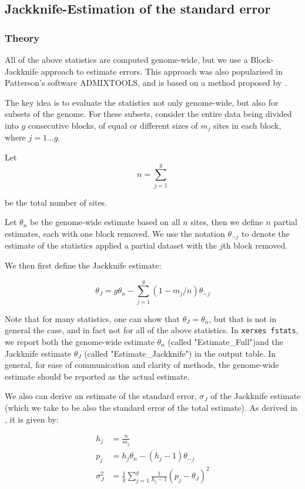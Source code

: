 \documentclass{article}
\begin{document}
\subsection{Jackknife-Estimation of the standard error}

\subsubsection{Theory}
All of the above statistics are computed genome-wide, but we use a Block-Jackknife approach to estimate errors. This approach was also popularised in Patterson's software ADMIXTOOLS, and is based on a method proposed by \cite{Busing1999-ev}.

The key idea is to evaluate the statistics not only genome-wide, but also for subsets of the genome. For these subsets, consider the entire data being divided into $g$ consecutive blocks, of equal or different sizes of $m_j$ sites in each block, where $j=1\ldots g$.

Let 
$$n = \sum_{j=1}^g$$

be the total number of sites.

Let $\theta_n$ be the genome-wide estimate based on all $n$ sites, then we define $n$ partial estimates, each with one block removed. We use the notation $\theta_{-j}$ to denote the estimate of the statistics applied a partial dataset with the $j$th block removed.

We then first define the Jackknife estimate:

$$\theta_J = g \theta_n - \sum_{j=1}^g (1 - m_j / n) \theta_{-j}$$

Note that for many statistics, one can show that $\theta_J=\theta_n$, but that is not in general the case, and in fact not for all of the above statistics. In \texttt{xerxes fstats}, we report both the genome-wide estimate $\theta_n$ (called "Estimate\_Full")and the Jackknife estimate $\theta_J$ (called "Estimate\_Jackknife") in the output table. In general, for ease of communication and clarity of methods, the genome-wide estimate should be reported as the actual estimate.

We also can derive an estimate of the standard error, $\sigma_J$ of the Jackknife estimate (which we take to be also the standard error of the total estimate). As derived in \cite{Busing1999-ev}, it is given by:

\begin{equation}
\begin{split}
h_j &= \frac{n}{m_j}\\
p_j &= h_j \theta_n - (h_j - 1) \theta_{-j}\\
\sigma_J^2 &= \frac{1}{g} \sum_{j=1}^g \frac{1}{h_j - 1} (p_j - \theta_J)^2
\end{split}
\end{equation}
\end{document}
